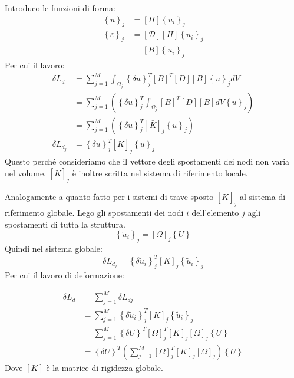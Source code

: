 Introduco le funzioni di forma:
\begin{align*}
 \left\{ u\right\}_j&= [H]\left\{u_i\right\}_j\\
 \left\{ \varepsilon\right\}_j&= [\mathcal{D}] [H]\left\{u_i\right\}_j\\
 &= [B]\left\{u_i\right\}_j
\end{align*}
Per cui il lavoro:
\begin{align*}
 \delta L_{d} &= \sum^M_{j=1} \int_{\Omega_j}     \left\{\delta u\right\}_j^T  [B]^T  [D]  [B]  \left\{ u\right\}_j dV\\
 &= \sum^M_{j=1}\left( \left\{\delta u\right\}_j^T \int_{\Omega_j}      [B]^T  [D]  [B]  dV    \left\{ u\right\}_j  \right)\\
 &= \sum^M_{j=1}\left( \left\{\delta u\right\}_j^T       [\bar{K}]_j      \left\{ u\right\}_j  \right)\\
 \delta L_{d_j} &= \left\{\delta u\right\}_j^T       [\bar{K}]_j      \left\{ u\right\}_j 
\end{align*}
Questo perché consideriamo che il vettore degli spostamenti dei nodi non varia nel volume. $ [\bar{K}]_j  $ è inoltre scritta nel sistema di riferimento locale.

Analogamente a quanto fatto per i sistemi di trave sposto $ [\bar{K}]_j  $ al sistema di riferimento globale. Lego gli spostamenti dei nodi $i$ dell'elemento $j$ agli spostamenti di tutta la struttura.
\begin{equation*}
  \left\{ \tilde{u}_i\right\}_j =   [\Omega]_j  \left\{ U\right\} 
\end{equation*}
Quindi nel sistema globale:
\begin{equation*}
 \delta L_{d_j} = \left\{\delta \tilde{u}_i\right\}_j^T       [K]_j      \left\{ \tilde{u}_i\right\}_j 
\end{equation*}
Per cui il lavoro di deformazione:

\begin{align*}
        \delta L_d  &=\sum_{j=1}^M \delta L_{dj} \\
        &= \sum_{j=1}^M    \left\{\delta \tilde{u}_i\right\}_j^T       [K]_j      \left\{ \tilde{u}_i\right\}_j    \\
          &= \sum_{j=1}^M  \left\{ \delta  U\right\} ^T   [\Omega]_j^T   [K]_j     [\Omega]_j  \left\{ U\right\}\\
          &=   \left\{ \delta  U\right\}^T   \left( \sum_{j=1}^M   [\Omega]_j^T   [K]_j     [\Omega]_j   \right)\left\{ U\right\}
    \end{align*}
    Dove $[K] $ è la matrice di rigidezza globale.

